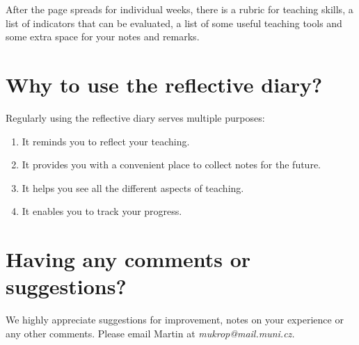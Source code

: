 After the page spreads for individual weeks, there is a rubric for teaching skills, a list of indicators that can be evaluated, a list of some useful teaching tools and some extra space for your notes and remarks.

\section*{Why to use the reflective diary?}

Regularly using the reflective diary serves multiple purposes:
\begin{enumerate}[topsep=0pt]
\item It reminds you to reflect your teaching.
\item It provides you with a convenient place to collect notes for the future.
\item It helps you see all the different aspects of teaching.
\item It enables you to track your progress.
\end{enumerate}

\section*{Having any comments or suggestions?}

We highly appreciate suggestions for improvement, notes on your experience or any other comments. Please email Martin at \textit{mukrop@mail.muni.cz.}
